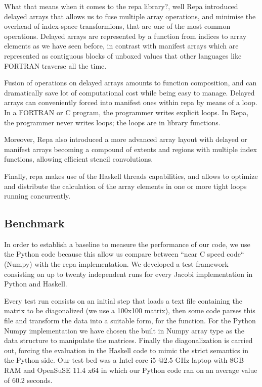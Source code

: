 \documentclass{tmr}
\begin{document}
What that means when it comes to the repa library?, well Repa introduced
delayed arrays that allows us to fuse multiple array operations, and 
minimise the overhead of index-space transformions, that are one of the most
common operations. Delayed arrays are represented by a function from indices 
to array elements as we have seen before, in contrast with manifest arrays
which are represented as contiguous blocks of unboxed values that other 
languages like FORTRAN traverse all the time. 

Fusion of operations on delayed arrays amounts to function composition, and 
can dramatically save lot of computational cost while being easy to manage. 
Delayed arrays can conveniently forced into manifest ones within repa by means 
of a loop. In a FORTRAN or C program, the programmer writes explicit loops. 
In Repa, the programmer never writes loops; the loops are in library functions.

Moreover, Repa also introduced a more advanced array layout with delayed or manifest 
arrays becoming a compound of extents and regions with multiple index functions, 
allowing efficient stencil convolutions.

Finally, repa makes use of the Haskell threads capabilities, and allows to optimize and
distribute the calculation of the array elements in one or more tight loops running concurrently.


\subsection{Benchmark}

In order to establish a baseline to measure the performance of our code, 
we use the Python code because this allow us compare between ``near C speed code``
(Numpy) with the repa implementation. We developed a test framework consisting 
on up to twenty independent runs for every Jacobi implementation in Python and Haskell.

Every test run consists on an initial step that loads a text file containing
the matrix to be diagonalized (we use a 100x100 matrix), then some code parses
this file and transform the data into a suitable form, for the  function. 
For the Python Numpy implementation we have chosen the built in Numpy array type
as the data structure to manipulate the matrices. Finally the diagonalization is
carried out, forcing the evaluation in the Haskell code to mimic the strict 
semantics in the Python side. Our test bed was a Intel core i5 @2.5 GHz 
laptop with 8GB RAM and OpenSuSE 11.4 x64 in which our Python code 
ran on an average value of 60.2 seconds. 
\end{document}

